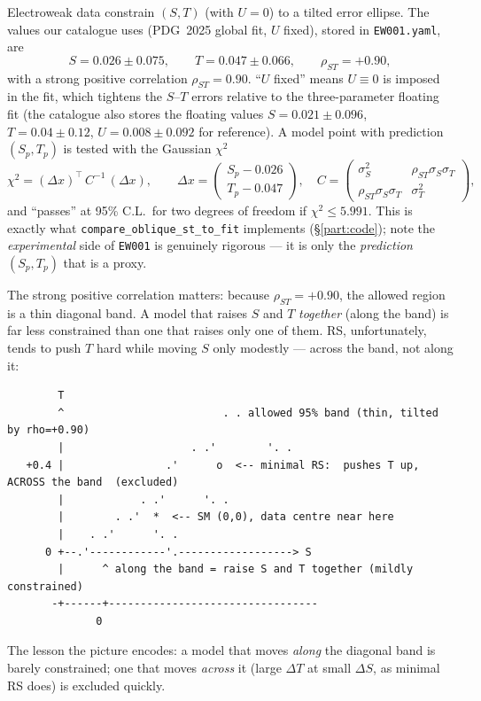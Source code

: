 \documentclass[11pt]{article}
\newcommand{\code}[1]{\texttt{#1}}
\theoremstyle{definition}
\begin{document}
Electroweak data constrain $(S,T)$ (with $U=0$) to a tilted error ellipse. The
values our catalogue uses (PDG~2025 global fit, $U$ fixed), stored in
\code{EW001.yaml}, are
\begin{equation}
S = 0.026 \pm 0.075, \qquad T = 0.047 \pm 0.066, \qquad \rho_{ST} = +0.90,
\label{eq:fit}
\end{equation}
with a strong positive correlation $\rho_{ST}=0.90$. ``$U$ fixed'' means $U\equiv0$
is imposed in the fit, which tightens the $S$--$T$ errors relative to the
three-parameter floating fit (the catalogue also stores the floating values
$S=0.021\pm0.096$, $T=0.04\pm0.12$, $U=0.008\pm0.092$ for reference). A model
point with prediction $(S_p,T_p)$ is tested with the Gaussian $\chi^2$
\begin{equation}
\chi^2 = (\Delta x)^\top \,C^{-1}\, (\Delta x), \qquad
\Delta x = \begin{pmatrix} S_p - 0.026 \\ T_p - 0.047 \end{pmatrix},\quad
C = \begin{pmatrix} \sigma_S^2 & \rho_{ST}\sigma_S\sigma_T \\
\rho_{ST}\sigma_S\sigma_T & \sigma_T^2 \end{pmatrix},
\label{eq:chi2}
\end{equation}
and ``passes'' at 95\% C.L.\ for two degrees of freedom if
$\chi^2 \le 5.991$. This is exactly what \code{compare\_oblique\_st\_to\_fit}
implements (\S\ref{part:code}); note the \emph{experimental} side of \code{EW001}
is genuinely rigorous --- it is only the \emph{prediction} $(S_p,T_p)$ that is a
proxy.

The strong positive correlation matters: because $\rho_{ST}=+0.90$, the
allowed region is a thin diagonal band. A model that raises $S$ and $T$
\emph{together} (along the band) is far less constrained than one that raises
only one of them. RS, unfortunately, tends to push $T$ hard while moving $S$
only modestly --- across the band, not along it:
\begin{footnotesize}
\begin{verbatim}
        T
        ^                         . . allowed 95% band (thin, tilted by rho=+0.90)
        |                    . .'        '. .
   +0.4 |                .'      o  <-- minimal RS:  pushes T up, ACROSS the band  (excluded)
        |            . .'      '. .
        |        . .'  *  <-- SM (0,0), data centre near here
        |    . .'      '. .
      0 +--.'------------'.------------------> S
        |      ^ along the band = raise S and T together (mildly constrained)
       -+------+---------------------------------
              0
\end{verbatim}
\end{footnotesize}
The lesson the picture encodes: a model that moves \emph{along} the diagonal band
is barely constrained; one that moves \emph{across} it (large $\Delta T$ at small
$\Delta S$, as minimal RS does) is excluded quickly.
\end{document}
